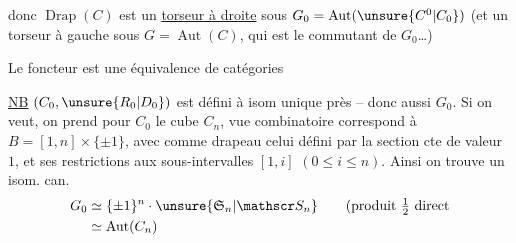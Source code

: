 donc $\operatorname{Drap}(C)$ est un \uline{torseur à droite} sous $G_0=\operatorname{Aut}(\unsure{C^{0}|C_0})$ (et un torseur à gauche sous $G=\operatorname{Aut}(C)$, qui est le commutant de $G_0$\ldots)

Le foncteur
est une équivalence de catégories

\uline{NB} $(C_0,\unsure{R_0|D_0})$ est défini à isom unique près -- donc aussi $G_0$. Si on veut, on prend pour $C_0$ le cube  $C_n$,   vue combinatoire correspond à $B=[1,n]\times\{\pm1\}$, avec comme drapeau celui défini par la section cte de valeur $1$, et ses restrictions aux sous-intervalles $[1,i]$ $(0\leq i\leq n)$. Ainsi on trouve un isom. can.
\[
\begin{aligned}
G_0&\simeq\{\pm1\}^n\cdot\unsure{\mathfrak S_n|\mathscr S_n}
\qquad\text{(produit }\tfrac12\text{ direct}\\
&\simeq\operatorname{Aut}(C_n)
\end{aligned}
\]
